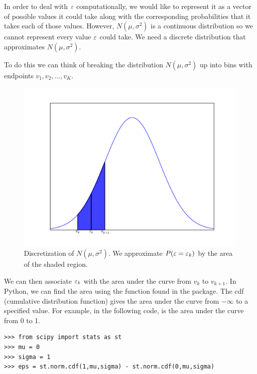 In order to deal with $\varepsilon$ computationally, we would like to represent it as a vector of possible values 
it could take along with the corresponding probabilities that it takes each of those values.  However, 
$N(\mu,\sigma^2)$ is a continuous distribution so we cannot represent every value $\varepsilon$ could take.  
We need a discrete distribution that approximates $N(\mu,\sigma^2)$.

To do this we can think of breaking the distribution $N(\mu,\sigma^2)$ up into bins with endpoints 
$v_1,v_2,\ldots, v_K$.

\begin{figure}[h!]
\label{stoch1_fig1}
\begin{center}
\includegraphics[width = \textwidth]{discnorm.pdf}
\end{center}
\caption{Discretization of $N(\mu,\sigma^2)$.  We approximate $P(\varepsilon = \varepsilon_k)$ by the area of the shaded region.}
\end{figure}

We can then associate $\varepsilon_k$ with the area under the curve from $v_k$ to $v_{k+1}$.  
In Python, we can find the area using the function  found in the  package.  
The cdf (cumulative distribution function) gives the area under the curve from $-\infty$ to a specified value. 
For example, in the following code,  is the area under the curve from 0 to 1.

\begin{lstlisting}
>>> from scipy import stats as st
>>> mu = 0
>>> sigma = 1
>>> eps = st.norm.cdf(1,mu,sigma) - st.norm.cdf(0,mu,sigma)
\end{lstlisting}

